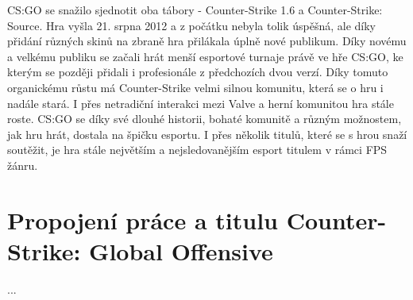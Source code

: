 \ac{CS:GO} se snažilo sjednotit oba tábory - Counter-Strike 1.6 a Counter-Strike: Source. Hra vyšla 21. srpna 2012 a z počátku nebyla tolik úspěšná, ale díky přidání různých skinů\cite{Valve2013} na zbraně hra přilákala
úplně nové publikum. Díky novému a velkému publiku se začali hrát menší esportové turnaje právě ve hře \ac{CS:GO}, ke kterým se později přidali i profesionále z předchozích dvou verzí. Díky tomuto organickému růstu má
Counter-Strike velmi silnou komunitu, která se o hru i nadále stará. I přes netradiční interakci mezi Valve a herní komunitou hra stále roste. \ac{CS:GO} se díky své dlouhé historii, bohaté komunitě a různým možnostem,
jak hru hrát, dostala na špičku esportu. I přes několik titulů, které se s hrou snaží soutěžit, je hra stále největším a nejsledovanějším esport titulem v rámci \ac{FPS} žánru.

\section{Propojení práce a titulu Counter-Strike: Global Offensive}
...
